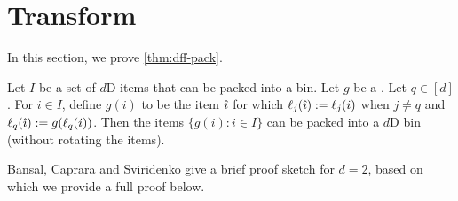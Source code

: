 \section{\DFF{} Transform}
\label{sec:dff-trn}

In this section, we prove \cref{thm:dff-pack}.

\begin{lemma}
\label{thm:dff-pack-1}
Let $I$ be a set of $d$D items that can be packed into a bin. Let $g$ be a \dff{}.
Let $q \in [d]$. For $i \in I$, define $g(i)$ to be the item $\hat{\imath}$ for which
$\ell_j(\hat{\imath}) := \ell_j(i)$ when $j \neq q$ and $\ell_q(\hat{\imath}) := g(\ell_q(i))$.
Then the items $\{g(i): i \in I\}$ can be packed into a $d$D bin (without rotating the items).
\end{lemma}
Bansal, Caprara and Sviridenko \cite{rna} give a brief proof sketch for $d=2$,
based on which we provide a full proof below.
